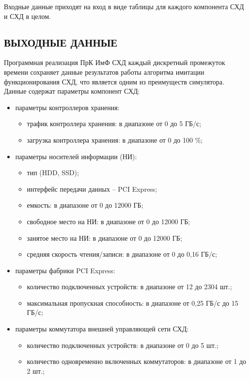 Входные данные приходят на вход в виде таблицы для каждого компонента СХД и
СХД в целом.

\subsection{ВЫХОДНЫЕ ДАННЫЕ}

Программная реализация ПрК ИмФ СХД каждый дискретный промежуток времени сохраняет данные результатов работы алгоритма имитации функционирования СХД, что является одним из преимуществ симулятора. Данные содержат параметры компонент
СХД:

\begin{itemize}
	\item параметры контроллеров хранения:
	\begin{itemize}
		\item трафик контроллера хранения: в диапазоне от 0 до 5 ГБ/с;
		\item загрузка контроллера хранения: в диапазоне от 0 до 100 \%;
	\end{itemize}
	\item параметры носителей информации (НИ):
	\begin{itemize}
		\item тип (HDD, SSD);
		\item интерфейс передачи данных – PCI Express;
		\item емкость: в диапазоне от 0 до 12000 ГБ;
		\item свободное место на НИ: в диапазоне от 0 до 12000 ГБ;
		\item занятое место на НИ: в диапазоне от 0 до 12000 ГБ;
		\item средняя скорость чтения/записи: в диапазоне от 0 до 0,16 ГБ/с;
	\end{itemize}
	\item параметры фабрики PCI Express:
	\begin{itemize}
		\item количество подключенных устройств: в диапазоне от 12 до 2304 шт.;
		\item максимальная пропускная способность: в диапазоне от 0,25 ГБ/с до 15 ГБ/с;
	\end{itemize}
	\item параметры коммутатора внешней управляющей сети СХД:
	\begin{itemize}
		\item количество подключенных устройств: в диапазоне от 0 до 5 шт.;
		\item количество одновременно включенных коммутаторов: в диапазоне от 1 до 2 шт.;

\end{itemize}
\end{itemize}
